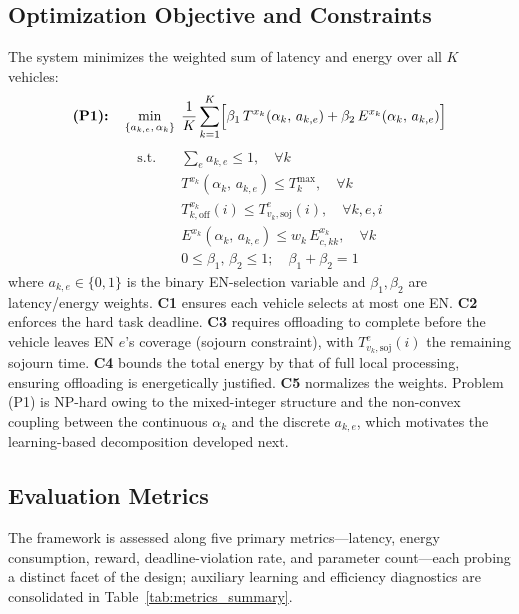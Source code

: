 \documentclass[11pt,a4paper]{article}
\theoremstyle{definition}
\begin{document}
\subsection{Optimization Objective and Constraints}
\label{subsec:objective}

The system minimizes the weighted sum of latency and energy over all $K$ vehicles:
\begin{equation}
  \textbf{(P1):} \quad
  \min_{\{a_{k,e},\,\alpha_k\}}
  \;\frac{1}{K}\sum_{k=1}^{K}
  \Bigl[\beta_1\,T^{x_k}\!\left(\alpha_k,\,a_{k,e}\right)
       + \beta_2\,E^{x_k}\!\left(\alpha_k,\,a_{k,e}\right)\Bigr]
  \label{eq:P1}
\end{equation}
\begin{align}
  \text{s.t.} \quad
    & \sum_{e} a_{k,e} \leq 1, \quad \forall k
      \tag{C1}\label{eq:c1}\\
    & T^{x_k}\!\left(\alpha_k,\,a_{k,e}\right) \leq T_k^{\max}, \quad \forall k
      \tag{C2}\label{eq:c2}\\
    & T_{k,\mathrm{off}}^{x_k}(i) \leq T_{v_k,\mathrm{soj}}^{e}(i), \quad \forall k,e,i
      \tag{C3}\label{eq:c3}\\
    & E^{x_k}\!\left(\alpha_k,\,a_{k,e}\right) \leq w_k\,E_{c,kk}^{x_k}, \quad \forall k
      \tag{C4}\label{eq:c4}\\
    & 0 \leq \beta_1,\,\beta_2 \leq 1;\quad \beta_1 + \beta_2 = 1
      \tag{C5}\label{eq:c5}
\end{align}
where $a_{k,e} \in \{0,1\}$ is the binary EN-selection variable and $\beta_1, \beta_2$ are latency/energy weights. \textbf{C1} ensures each vehicle selects at most one EN. \textbf{C2} enforces the hard task deadline. \textbf{C3} requires offloading to complete before the vehicle leaves EN $e$'s coverage (sojourn constraint), with $T_{v_k,\mathrm{soj}}^{e}(i)$ the remaining sojourn time. \textbf{C4} bounds the total energy by that of full local processing, ensuring offloading is energetically justified. \textbf{C5} normalizes the weights. Problem (P1) is NP-hard owing to the mixed-integer structure and the non-convex coupling between the continuous $\alpha_k$ and the discrete $a_{k,e}$, which motivates the learning-based decomposition developed next.

\subsection{Evaluation Metrics}
\label{subsec:metrics}

The framework is assessed along five primary metrics---latency, energy consumption, reward, deadline-violation rate, and parameter count---each probing a distinct facet of the design; auxiliary learning and efficiency diagnostics are consolidated in Table~\ref{tab:metrics_summary}.
\end{document}
